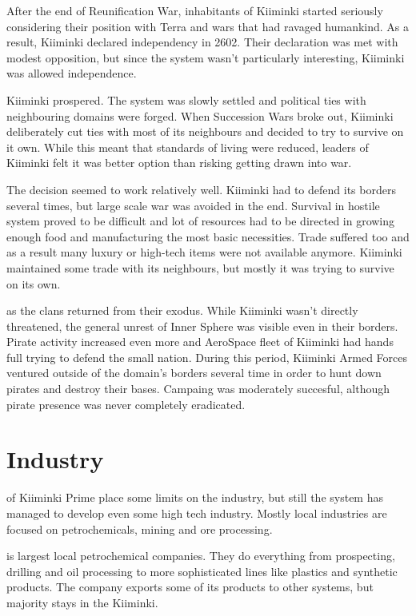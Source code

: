 \documentclass{tufte-book}
\begin{document}
After the end of Reunification War, inhabitants of Kiiminki started seriously
considering their position with Terra and wars that had ravaged humankind. As
a result, Kiiminki declared independency in 2602. Their declaration was met
with modest opposition, but since the system wasn't particularly interesting,
Kiiminki was allowed independence.

 Kiiminki prospered. The system was slowly
settled and political ties with neighbouring domains were forged. When
Succession Wars broke out, Kiiminki deliberately cut ties with most of its
neighbours and decided to try to survive on it own. While this meant that
standards of living were reduced, leaders of Kiiminki felt it was better
option than risking getting drawn into war.

The decision seemed to work relatively well. Kiiminki had to defend its
borders several times, but large scale war was avoided in the end. Survival
in hostile system proved to be difficult and lot of resources had to be
directed in growing enough food and manufacturing the most basic necessities.
Trade suffered too and as a result many luxury or high-tech items were not
available anymore. Kiiminki maintained some trade with its neighbours, but
mostly it was trying to survive on its own.

 as the clans returned from their
exodus. While Kiiminki wasn't directly threatened, the general unrest of
Inner Sphere was visible even in their borders. Pirate activity increased even
more and AeroSpace fleet of Kiiminki had hands full trying to defend the
small nation. During this period, Kiiminki Armed Forces ventured outside of
the domain's borders several time in order to hunt down pirates and destroy
their bases. Campaing was moderately succesful, although pirate presence was
never completely eradicated.

\chapter{Industry}
\label{ch:industry}

 of Kiiminki Prime place some limits on the
industry, but still the system has managed to develop even some high tech
industry. Mostly local industries are focused on petrochemicals, mining and
ore processing.

 is largest local petrochemical companies.
They do everything from prospecting, drilling and oil processing to more
sophisticated lines like plastics and synthetic products. The company exports
some of its products to other systems, but majority stays in the Kiiminki.
\end{document}
